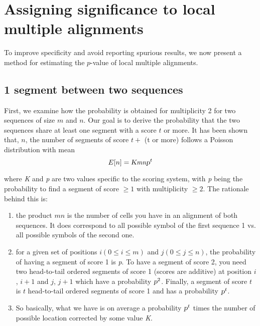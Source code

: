 \documentclass{ws-procs9x6}
\begin{document}
\section{Assigning significance to local multiple alignments}
To improve specificity and avoid reporting spurious results, we now present a method for estimating the $p$-value of local multiple alignments.

\subsection{1 segment between two sequences}

First, we examine how the probability is obtained for multiplicity 2 for two sequences of size
$m$ and $n$. Our goal is to derive the probability that the two sequences share at least one
segment with a score $t$ or more. It has been shown that, $n$, the number of segments of score $t+$ (t or more) follows a
Poisson distribution with mean
\begin{equation}
E[n]=\textsl{K}\textit{mn}\textsl{p}^{t}
\end{equation}

where \textsl{K} and \textsl{p} are two values specific to the scoring system, with \textsl{p} being the probability to find a segment of score $\geq 1$ with multiplicity $\geq 2$. The rationale behind this is:

\begin{enumerate}
\item the product $mn$ is the number of cells you have in an alignment of both sequences. It
does correspond to all possible symbol of the first sequence 1 vs. all possible symbols
of the second one.

\item for a given set of positions $i(0 \leq i \leq m)$ and $j(0 \leq j \leq n)$, the probability of having
a segment of score 1 is \textsl{p}. To have a segment of score 2, you need two head-to-tail
ordered segments of score 1 (scores are additive) at position $i$, $i+1$ and $j$, $j +1$ which
have a probability $\textsl{p}^{2}$. Finally, a segment of score $t$ is $t$ head-to-tail ordered segments
of score 1 and has a probability $\textsl{p}^{t}$.

\item So basically, what we have is on average a probability $\textsl{p}^{t}$ times the number of possible
location corrected by some value \textsl{K}.
\end{enumerate}
\end{document}
